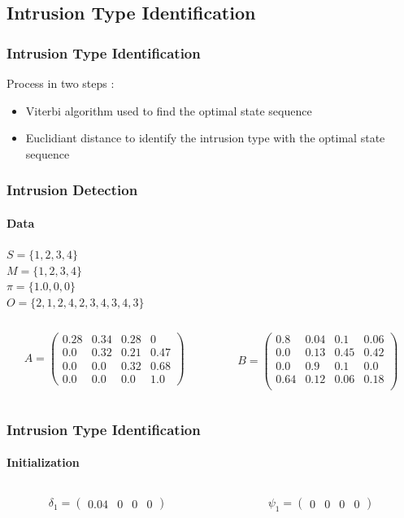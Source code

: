 \documentclass{beamer}
\begin{document}
\subsection{Intrusion Type Identification}
\begin{frame}
  \frametitle{Intrusion Type Identification}
  Process in two steps :
  \begin{itemize}
  \item Viterbi algorithm used to find the optimal state sequence
  \item Euclidiant distance to identify the intrusion type with the
    optimal state sequence
  \end{itemize}
\end{frame}
\begin{frame}
  \frametitle{Intrusion Detection}
  \framesubtitle{Data}
  $S = \{1,2,3,4\}$\\
  $M = \{1,2,3,4\}$\\
  $\pi = \{1.0,0,0\}$\\
  $O = \{2,1,2,4,2,3,4,3,4,3\}$
  \begin{columns}[T]
    \begin{column}{.45\textwidth}
      $$
      A = \begin{pmatrix}
        0.28 & 0.34 & 0.28 & 0\\
        0.0 & 0.32 & 0.21 & 0.47\\
        0.0 & 0.0 & 0.32 & 0.68\\
        0.0 & 0.0 & 0.0 & 1.0
      \end{pmatrix}
      $$
    \end{column}
    \begin{column}{.45\textwidth}
      $$
      B = \begin{pmatrix}
        0.8 & 0.04 & 0.1 & 0.06\\
        0.0 & 0.13 & 0.45 & 0.42\\
        0.0 & 0.9 & 0.1 & 0.0\\
        0.64 & 0.12 & 0.06 & 0.18\\
      \end{pmatrix}
      $$
    \end{column}
  \end{columns}
\end{frame}
\begin{frame}
  \frametitle{Intrusion Type Identification}
  \framesubtitle{Initialization}
  \begin{columns}[T]
    \begin{column}{.45\textwidth}
      $$
      \delta_1 = \begin{pmatrix} 0.04 & 0 & 0 & 0\end{pmatrix}
      $$
    \end{column}
    \begin{column}{.45\textwidth}
      $$
      \psi_1 = \begin{pmatrix}0&0&0&0\end{pmatrix}
      $$
    \end{column}
  \end{columns}
\end{frame}
\end{document}
